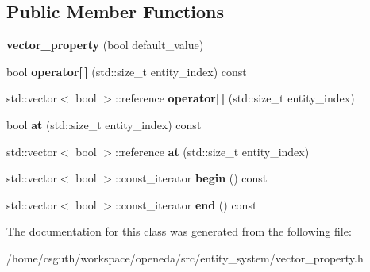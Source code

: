 \subsection*{Public Member Functions}
\begin{DoxyCompactItemize}
\item 
\hypertarget{classophidian_1_1entity__system_1_1vector__property_3_01bool_01_4_a36f8abf4d689faa23149202debbbbe65}{{\bfseries vector\-\_\-property} (bool default\-\_\-value)}\label{classophidian_1_1entity__system_1_1vector__property_3_01bool_01_4_a36f8abf4d689faa23149202debbbbe65}

\item 
\hypertarget{classophidian_1_1entity__system_1_1vector__property_3_01bool_01_4_a9fcf44d1edfac7e4f84667e7bb6efe8c}{bool {\bfseries operator\mbox{[}$\,$\mbox{]}} (std\-::size\-\_\-t entity\-\_\-index) const }\label{classophidian_1_1entity__system_1_1vector__property_3_01bool_01_4_a9fcf44d1edfac7e4f84667e7bb6efe8c}

\item 
\hypertarget{classophidian_1_1entity__system_1_1vector__property_3_01bool_01_4_a186fd8dea36dab14fc5b66e3e75c1272}{std\-::vector$<$ bool $>$\-::reference {\bfseries operator\mbox{[}$\,$\mbox{]}} (std\-::size\-\_\-t entity\-\_\-index)}\label{classophidian_1_1entity__system_1_1vector__property_3_01bool_01_4_a186fd8dea36dab14fc5b66e3e75c1272}

\item 
\hypertarget{classophidian_1_1entity__system_1_1vector__property_3_01bool_01_4_ac8423a83c945866a1e17128cef78c6fc}{bool {\bfseries at} (std\-::size\-\_\-t entity\-\_\-index) const }\label{classophidian_1_1entity__system_1_1vector__property_3_01bool_01_4_ac8423a83c945866a1e17128cef78c6fc}

\item 
\hypertarget{classophidian_1_1entity__system_1_1vector__property_3_01bool_01_4_afe79c9e58030adbb8650fba8a2d1f1c0}{std\-::vector$<$ bool $>$\-::reference {\bfseries at} (std\-::size\-\_\-t entity\-\_\-index)}\label{classophidian_1_1entity__system_1_1vector__property_3_01bool_01_4_afe79c9e58030adbb8650fba8a2d1f1c0}

\item 
\hypertarget{classophidian_1_1entity__system_1_1vector__property_3_01bool_01_4_aafaff723d98207bdef055b5927f5d6ac}{std\-::vector$<$ bool $>$\-::const\-\_\-iterator {\bfseries begin} () const }\label{classophidian_1_1entity__system_1_1vector__property_3_01bool_01_4_aafaff723d98207bdef055b5927f5d6ac}

\item 
\hypertarget{classophidian_1_1entity__system_1_1vector__property_3_01bool_01_4_a6e92123687ce059b03b2d0c51a3d13f5}{std\-::vector$<$ bool $>$\-::const\-\_\-iterator {\bfseries end} () const }\label{classophidian_1_1entity__system_1_1vector__property_3_01bool_01_4_a6e92123687ce059b03b2d0c51a3d13f5}

\end{DoxyCompactItemize}


The documentation for this class was generated from the following file\-:\begin{DoxyCompactItemize}
\item 
/home/csguth/workspace/openeda/src/entity\-\_\-system/vector\-\_\-property.\-h\end{DoxyCompactItemize}
